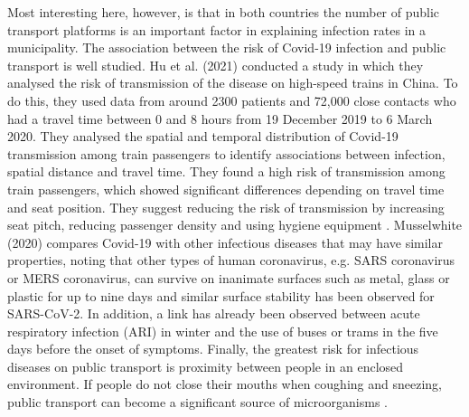 Most interesting here, however, is that in both countries the number of public transport platforms is an important factor in explaining infection rates in a municipality. The association between the risk of Covid-19 infection and public transport is well studied. Hu et al. (2021) conducted a study in which they analysed the risk of transmission of the disease on high-speed trains in China. To do this, they used data from around 2300 patients and 72,000 close contacts who had a travel time between 0 and 8 hours from 19 December 2019 to 6 March 2020. They analysed the spatial and temporal distribution of Covid-19 transmission among train passengers to identify associations between infection, spatial distance and travel time. They found a high risk of transmission among train passengers, which showed significant differences depending on travel time and seat position. They suggest reducing the risk of transmission by increasing seat pitch, reducing passenger density and using hygiene equipment \autocite[][]{hu2021risk}. Musselwhite (2020) compares Covid-19 with other infectious diseases that may have similar properties, noting that other types of human coronavirus, e.g. SARS coronavirus or MERS coronavirus, can survive on inanimate surfaces such as metal, glass or plastic for up to nine days and similar surface stability has been observed for SARS-CoV-2. In addition, a link has already been observed between acute respiratory infection (ARI) in winter and the use of buses or trams in the five days before the onset of symptoms. Finally, the greatest risk for infectious diseases on public transport is proximity between people in an enclosed environment. If people do not close their mouths when coughing and sneezing, public transport can become a significant source of microorganisms \autocite[][]{musselwhite2020editorial}.
\clearpage
